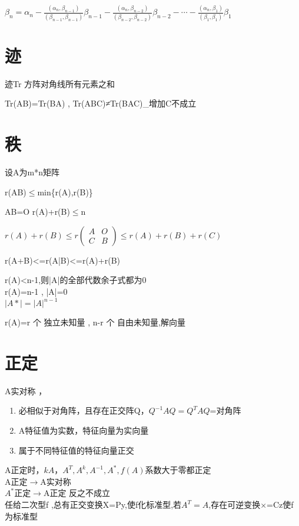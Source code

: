 \documentclass[UTF8]{ctexart}
\begin{document}
$\beta_{n}=\alpha_{n}-\frac{(\alpha_{n},\beta_{n-1})}{(\beta_{n-1},\beta_{n-1})}\beta_{n-1}-\frac{(\alpha_{n},\beta_{n-2})}{(\beta_{n-2},\beta_{n-2})}\beta_{n-2}-\cdots-\frac{(\alpha_{n},\beta_{1})}{(\beta_{1},\beta_{1})}\beta_{1}$

\section{迹}

迹Tr 方阵对角线所有元素之和

Tr(AB)=Tr(BA) , Tr(ABC)≠Tr(BAC)\_增加C不成立

\section{秩}

设A为m{*}n矩阵

r(AB)$\leq$min\{r(A),r(B)\}

AB=O r(A)+r(B)$\leq$n

$r(A)+r(B)\leq r\begin{pmatrix}A & O\\
C & B
\end{pmatrix}\leq r(A)+r(B)+r(C)$

r(A+B)<=r(A|B)<=r(A)+r(B)

r(A)<n-1,则|A|的全部代数余子式都为0 \\
r(A)=n-1 , |A|=0 \\
$|A*|=|A|^{n-1}$

r(A)=r 个 独立未知量 , n-r 个 自由未知量,解向量

\section{正定}
A实对称 ，
\begin{enumerate}
  \item 必相似于对角阵，且存在正交阵Q，$Q^{-1}AQ=Q^TAQ$=对角阵
  \item A特征值为实数，特征向量为实向量
  \item 属于不同特征值的特征向量正交
\end{enumerate}

  A正定时，$kA，A^T , A^k , A^{-1} , A^* , f(A)\mbox{系数大于零} $都正定 \\

  A正定$\rightarrow$A实对称 \\
 $A^*$正定$\rightarrow$A正定  反之不成立 \\
任给二次型f ,总有正交变换X=Py,使f化标准型,若$A^T=A$,存在可逆变换×=Cz使f为标准型 \\
\end{document}
